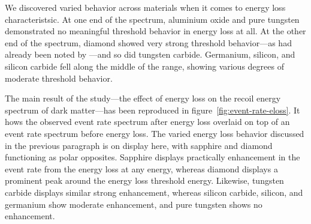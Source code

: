 \documentclass[b5paper, 10pt, twoside]{book}
\begin{document}
We discovered varied behavior across materials when it comes to energy loss characteristsic. At one end of the spectrum, aluminium oxide and pure tungsten demonstrated no meaningful threshold behavior in energy loss at all. At the other end of the spectrum, diamond showed very strong threshold behavior---as had already been noted by \textcite{KadribasicEtAl2020}---and so did tungsten carbide. Germanium, silicon, and silicon carbide fell along the middle of the range, showing various degrees of moderate threshold behavior.

The main result of the study---the effect of energy loss on the recoil energy spectrum of dark matter---has been reproduced in figure~\ref{fig:event-rate-eloss}. It hows the observed event rate spectrum after energy loss overlaid on top of an event rate spectrum before energy loss. The varied energy loss behavior discussed in the previous paragraph is on display here, with sapphire and diamond functioning as polar opposites. Sapphire displays practically enhancement in the event rate from the energy loss at any energy, whereas diamond displays a prominent peak around the energy loss threshold energy. Likewise, tungsten carbide displays similar strong enhancement, whereas silicon carbide, silicon, and germanium show moderate enhancement, and pure tungsten shows no enhancement.
\end{document}
